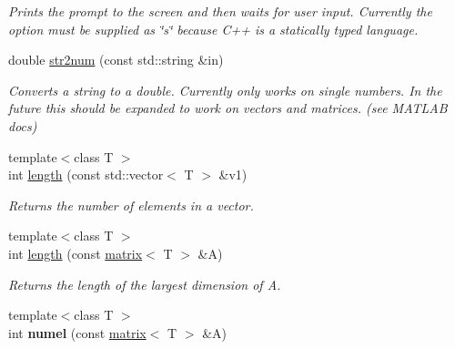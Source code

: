 \begin{DoxyCompactItemize}
\begin{DoxyCompactList}\small\item\em Prints the prompt to the screen and then waits for user input. Currently the option must be supplied as \char`\"{}s\char`\"{} because C++ is a statically typed language. \end{DoxyCompactList}\item 
\hypertarget{namespacekeycpp_a4bca7924aad17a920f2f5f0606e6d9a9}{double \hyperlink{namespacekeycpp_a4bca7924aad17a920f2f5f0606e6d9a9}{str2num} (const std\-::string \&in)}\label{namespacekeycpp_a4bca7924aad17a920f2f5f0606e6d9a9}

\begin{DoxyCompactList}\small\item\em Converts a string to a double. Currently only works on single numbers. In the future this should be expanded to work on vectors and matrices. (see M\-A\-T\-L\-A\-B docs) \end{DoxyCompactList}\item 
\hypertarget{namespacekeycpp_a1c5fcab6592307cffe0e9aa035122a2e}{{\footnotesize template$<$class T $>$ }\\int \hyperlink{namespacekeycpp_a1c5fcab6592307cffe0e9aa035122a2e}{length} (const std\-::vector$<$ T $>$ \&v1)}\label{namespacekeycpp_a1c5fcab6592307cffe0e9aa035122a2e}

\begin{DoxyCompactList}\small\item\em Returns the number of elements in a vector. \end{DoxyCompactList}\item 
\hypertarget{namespacekeycpp_a856e64b0828ca7b61e301e8a803cfa91}{{\footnotesize template$<$class T $>$ }\\int \hyperlink{namespacekeycpp_a856e64b0828ca7b61e301e8a803cfa91}{length} (const \hyperlink{classkeycpp_1_1matrix}{matrix}$<$ T $>$ \&A)}\label{namespacekeycpp_a856e64b0828ca7b61e301e8a803cfa91}

\begin{DoxyCompactList}\small\item\em Returns the length of the largest dimension of A. \end{DoxyCompactList}\item 
\hypertarget{namespacekeycpp_abd52330177821fc7cbf3f1c29e49f476}{{\footnotesize template$<$class T $>$ }\\int {\bfseries numel} (const \hyperlink{classkeycpp_1_1matrix}{matrix}$<$ T $>$ \&A)}\label{namespacekeycpp_abd52330177821fc7cbf3f1c29e49f476}


\end{DoxyCompactItemize}
